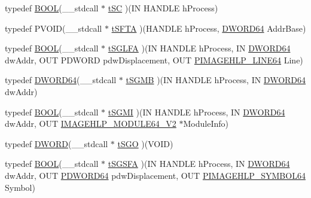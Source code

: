 \begin{DoxyCompactItemize}
\item 
typedef \hyperlink{class_stack_walker_internal_a1fc4c47aaad5ff92853793d0ef3146cd}{B\-O\-O\-L}(\-\_\-\-\_\-stdcall $\ast$ \hyperlink{class_stack_walker_internal_a9242b91e8d2d617d958977c3a7551ecc}{t\-S\-C} )(I\-N H\-A\-N\-D\-L\-E h\-Process)
\item 
typedef P\-V\-O\-I\-D(\-\_\-\-\_\-stdcall $\ast$ \hyperlink{class_stack_walker_internal_afba034f54cdd3f3150457b66fa5d15c6}{t\-S\-F\-T\-A} )(H\-A\-N\-D\-L\-E h\-Process, \hyperlink{_stack_walker_8h_a97fb241c597b99bcb965858f53cacac4}{D\-W\-O\-R\-D64} Addr\-Base)
\item 
typedef \hyperlink{class_stack_walker_internal_a1fc4c47aaad5ff92853793d0ef3146cd}{B\-O\-O\-L}(\-\_\-\-\_\-stdcall $\ast$ \hyperlink{class_stack_walker_internal_a855cd4ed76c6a5f33bc2cf261ab44222}{t\-S\-G\-L\-F\-A} )(I\-N H\-A\-N\-D\-L\-E h\-Process, I\-N \hyperlink{_stack_walker_8h_a97fb241c597b99bcb965858f53cacac4}{D\-W\-O\-R\-D64} dw\-Addr, O\-U\-T P\-D\-W\-O\-R\-D pdw\-Displacement, O\-U\-T \hyperlink{_stack_walker_8cpp_a02a0106b705d60bd132ba0e1a7e3b87d}{P\-I\-M\-A\-G\-E\-H\-L\-P\-\_\-\-L\-I\-N\-E64} Line)
\item 
typedef \hyperlink{_stack_walker_8h_a97fb241c597b99bcb965858f53cacac4}{D\-W\-O\-R\-D64}(\-\_\-\-\_\-stdcall $\ast$ \hyperlink{class_stack_walker_internal_a02d32f2ad652892dca2c319120d69743}{t\-S\-G\-M\-B} )(I\-N H\-A\-N\-D\-L\-E h\-Process, I\-N \hyperlink{_stack_walker_8h_a97fb241c597b99bcb965858f53cacac4}{D\-W\-O\-R\-D64} dw\-Addr)
\item 
typedef \hyperlink{class_stack_walker_internal_a1fc4c47aaad5ff92853793d0ef3146cd}{B\-O\-O\-L}(\-\_\-\-\_\-stdcall $\ast$ \hyperlink{class_stack_walker_internal_abeffddcc7bdd828153da4176e53b84c8}{t\-S\-G\-M\-I} )(I\-N H\-A\-N\-D\-L\-E h\-Process, I\-N \hyperlink{_stack_walker_8h_a97fb241c597b99bcb965858f53cacac4}{D\-W\-O\-R\-D64} dw\-Addr, O\-U\-T \hyperlink{struct_stack_walker_internal_1_1_i_m_a_g_e_h_l_p___m_o_d_u_l_e64___v2}{I\-M\-A\-G\-E\-H\-L\-P\-\_\-\-M\-O\-D\-U\-L\-E64\-\_\-\-V2} $\ast$Module\-Info)
\item 
typedef \hyperlink{class_stack_walker_internal_aa02cf07e5926c7dd20d31269185c52b0}{D\-W\-O\-R\-D}(\-\_\-\-\_\-stdcall $\ast$ \hyperlink{class_stack_walker_internal_aaec62abb6d868f9020216020f050d9de}{t\-S\-G\-O} )(V\-O\-I\-D)
\item 
typedef \hyperlink{class_stack_walker_internal_a1fc4c47aaad5ff92853793d0ef3146cd}{B\-O\-O\-L}(\-\_\-\-\_\-stdcall $\ast$ \hyperlink{class_stack_walker_internal_a95863814be54b0a535e4ec8570ab1a10}{t\-S\-G\-S\-F\-A} )(I\-N H\-A\-N\-D\-L\-E h\-Process, I\-N \hyperlink{_stack_walker_8h_a97fb241c597b99bcb965858f53cacac4}{D\-W\-O\-R\-D64} dw\-Addr, O\-U\-T \hyperlink{_stack_walker_8h_aee0d4bfea0b51eb8c099b516e21ad8f8}{P\-D\-W\-O\-R\-D64} pdw\-Displacement, O\-U\-T \hyperlink{_stack_walker_8cpp_a61ba945c2905d16b431a2d66ba569b01}{P\-I\-M\-A\-G\-E\-H\-L\-P\-\_\-\-S\-Y\-M\-B\-O\-L64} Symbol)

\end{DoxyCompactItemize}

